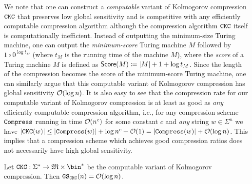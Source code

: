 We note that one can construct a \emph{computable} variant of Kolmogorov compression $\mathtt{CKC}$ that preserves low global sensitivity and is competitive with any efficiently computable compression algorithm although the compression algorithm $\mathtt{CKC}$ itself is computationally inefficient. Instead of outputting the minimum-size Turing machine, one can output the \emph{minimum-score} Turing machine $M$ followed by $1\circ 0^{\log t_M}$ (where $t_M$ is the running time of the machine $M$), where the \emph{score} of a Turing machine $M$ is defined as $\mathsf{Score}(M)\coloneqq|M|+1+\log t_M$. Since the length of the compression becomes the score of the minimum-score Turing machine, one can similarly argue that this computable variant of Kolmogorov compression has global sensitivity $\O{\log n}$. It is also easy to see that the compression rate for our computable variant of Kolmogorov compression is at least as good as {\em any} efficiently computable compression algorithm, i.e., for any compression scheme $\mathtt{Compress}$ running in time $\O{n^c}$ for some constant $c$ and {\em any} string $w \in \Sigma^n$ we have  $|\ckc(w)| \leq |\compress(w)| + \log n^c + \O{1} = |\compress(w)| + \O{\log n}$. This implies that a compression scheme which achieves good compression ratios does not necessarily have high global sensitivity. 

\newcommand{\kolcomp}{
Let $\ckc:\Sigma^*\rightarrow\mathfrak{M}\times\bin^*$ be the computable variant of Kolmogorov compression. Then $\GS_\ckc(n)=\O{\log n}$.
}
\begin{proposition}
    \kolcomp
\end{proposition}

